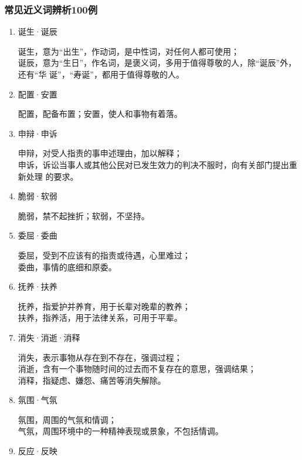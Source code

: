 \documentclass[final,oneside]{ctexbook}
\begin{document}
\subsubsection{常见近义词辨析100例}

\begin{enumerate}
  \item 诞生·诞辰

    诞生，意为“出生”，作动词，是中性词，对任何人都可使用；\\
    诞辰，意为“生日”，作名词，是褒义词，多用于值得尊敬的人，除“诞辰”外，还有“华
    诞”，“寿诞”，都用于值得尊敬的人。

  \item 配置·安置

    配置，配备布置；安置，使人和事物有着落。

  \item 申辩·申诉

    申辩，对受人指责的事申述理由，加以解释；\\
    申诉，诉讼当事人或其他公民对已发生效力的判决不服时，向有关部门提出重新处理
    的要求。

  \item 脆弱·软弱

    脆弱，禁不起挫折；软弱，不坚持。

  \item 委屈·委曲

    委屈，受到不应该有的指责或待遇，心里难过；\\
    委曲，事情的底细和原委。

  \item 抚养·扶养

    抚养，指爱护并养育，用于长辈对晚辈的教养；\\
    扶养，指养活，用于法律关系，可用于平辈。

  \item 消失·消逝·消释

    消失，表示事物从存在到不存在，强调过程；\\
    消逝，含有一个事物随时间的过去而不复存在的意思，强调结果；\\
    消释，指疑虑、嫌怨、痛苦等消失解除。

  \item 氛围·气氛

    氛围，周围的气氛和情调；\\
    气氛，周围环境中的一种精神表现或景象，不包括情调。

  \item 反应·反映


\end{enumerate}
\end{document}
